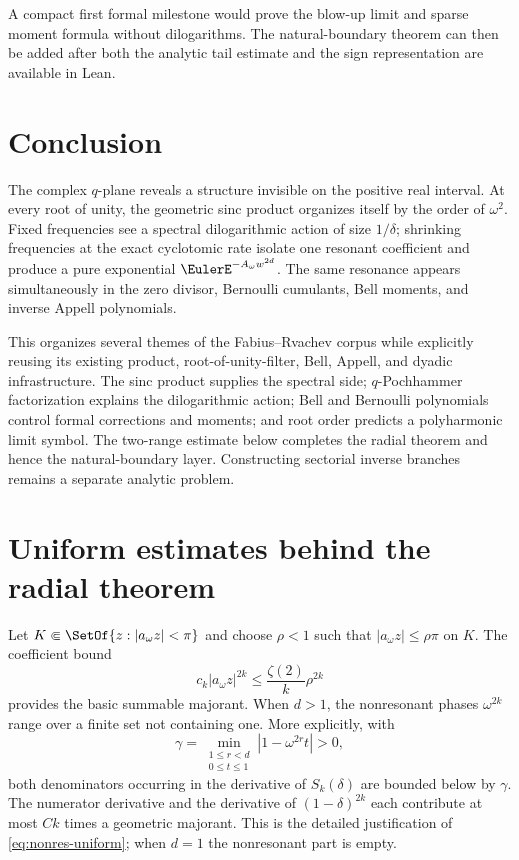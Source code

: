 \documentclass[11pt]{article}
\theoremstyle{definition}
\begin{document}
A compact first formal milestone would prove the blow-up limit and sparse moment formula without dilogarithms.  The natural-boundary theorem can then be added after both the analytic tail estimate and the sign representation are available in Lean.

\section{Conclusion}

The complex $q$-plane reveals a structure invisible on the positive real interval.  At every root of unity, the geometric sinc product organizes itself by the order of $\omega^2$.  Fixed frequencies see a spectral dilogarithmic action of size $1/\delta$; shrinking frequencies at the exact cyclotomic rate isolate one resonant coefficient and produce a pure exponential $\EulerE^{-A_\omega w^{2d}}$.  The same resonance appears simultaneously in the zero divisor, Bernoulli cumulants, Bell moments, and inverse Appell polynomials.

This organizes several themes of the Fabius--Rvachev corpus while explicitly
reusing its existing product, root-of-unity-filter, Bell, Appell, and dyadic
infrastructure.  The sinc product supplies the spectral side;
$q$-Pochhammer factorization explains the dilogarithmic action; Bell and
Bernoulli polynomials control formal corrections and moments; and root order
predicts a polyharmonic limit symbol.  The two-range estimate below completes
the radial theorem and hence the natural-boundary layer.  Constructing
sectorial inverse branches remains a separate analytic problem.

\appendix

\section{Uniform estimates behind the radial theorem}

Let $K\Subset\SetOf{z:|a_\omega z|<\pi}$ and choose $\rho<1$ such that
\(
 |a_\omega z|\le\rho\pi
\) on $K$.  The coefficient bound
\begin{equation}
 c_k|a_\omega z|^{2k}
 \le \frac{\zeta(2)}{k}\rho^{2k}
 \label{eq:ck-majorant}
\end{equation}
provides the basic summable majorant.  When $d>1$, the nonresonant phases
$\omega^{2k}$ range over a finite set not containing one.  More explicitly,
with
\[
 \gamma=\min_{\substack{1\le r<d\\0\le t\le1}}
 |1-\omega^{2r}t|>0,
\]
both denominators occurring in the derivative of $S_k(\delta)$ are bounded
below by $\gamma$.  The numerator derivative and the derivative of
$(1-\delta)^{2k}$ each contribute at most $Ck$ times a geometric majorant.
This is the detailed justification of \cref{eq:nonres-uniform}; when $d=1$
the nonresonant part is empty.
\end{document}

